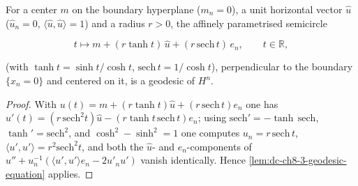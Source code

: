 \begin{lemma}
  \label{lem:dc-ch8-3-semicircle-geodesic}


  For a center $m$ on the boundary hyperplane ($m_n=0$), a unit horizontal vector
  $\hat u$ ($\hat u_n=0$, $\langle\hat u,\hat u\rangle=1$) and a radius $r>0$, the
  affinely parametrised semicircle

  $$
  t\longmapsto m+(r\tanh t)\,\hat u+(r\,\mathrm{sech}\,t)\,e_n,\qquad t\in\mathbb R,
  $$

  (with $\tanh t=\sinh t/\cosh t$, $\mathrm{sech}\,t=1/\cosh t$), perpendicular to
  the boundary $\{x_n=0\}$ and centered on it, is a geodesic of $H^n$.
\end{lemma}
\begin{proof}

\sketch
  With $u(t)=m+(r\tanh t)\hat u+(r\,\mathrm{sech}\,t)e_n$ one has
  $u'(t)=(r\,\mathrm{sech}^2 t)\hat u-(r\tanh t\,\mathrm{sech}\,t)e_n$; using
  $\mathrm{sech}'=-\tanh\,\mathrm{sech}$, $\tanh'=\mathrm{sech}^2$, and
  $\cosh^2-\sinh^2=1$ one computes $u_n=r\,\mathrm{sech}\,t$,
  $\langle u',u'\rangle=r^2\mathrm{sech}^2 t$, and both the $\hat u$- and
  $e_n$-components of $u''+u_n^{-1}(\langle u',u'\rangle e_n-2u'_n u')$ vanish
  identically. Hence \cref{lem:dc-ch8-3-geodesic-equation} applies.
\end{proof}

